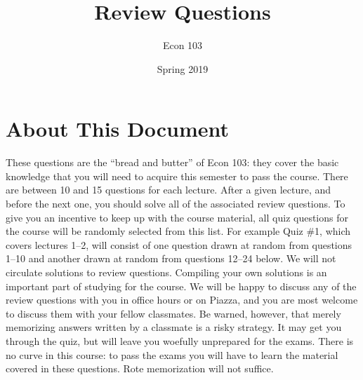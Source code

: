 \documentclass[addpoints,12pt]{exam}
\title{Review Questions}
\author{Econ 103}
\date{Spring 2019}
\begin{document}
\maketitle

\section*{About This Document}
These questions are the ``bread and butter'' of Econ 103: they cover the basic knowledge that you will need to acquire this semester to pass the course. 
There are between 10 and 15 questions for each lecture.
After a given lecture, and before the next one, you should solve all of the associated review questions.
To give you an incentive to keep up with the course material, all quiz questions for the course will be randomly selected from this list.
For example Quiz \#1, which covers lectures 1--2, will consist of one question drawn at random from questions 1--10 and another drawn at random from questions 12--24 below.
We will not circulate solutions to review questions.
Compiling your own solutions is an important part of studying for the course.
We will be happy to discuss any of the review questions with you in office hours or on Piazza, and you are most welcome to discuss them with your fellow classmates.
Be warned, however, that merely memorizing answers written by a classmate is a risky strategy.
It may get you through the quiz, but will leave you woefully unprepared for the exams.
There is no curve in this course: to pass the exams you will have to learn the material covered in these questions.
Rote memorization will not suffice.

\end{document}
